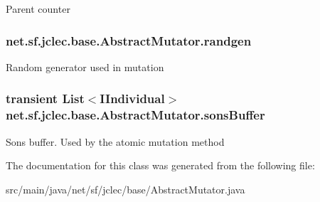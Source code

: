 Parent counter \hypertarget{classnet_1_1sf_1_1jclec_1_1base_1_1_abstract_mutator_a21907b5345c3af80722235d42aec079a}{
\subsubsection[{randgen}]{ net.\-sf.\-jclec.\-base.\-Abstract\-Mutator.\-randgen\hspace{0.3cm}{\ttfamily [protected]}}}\label{classnet_1_1sf_1_1jclec_1_1base_1_1_abstract_mutator_a21907b5345c3af80722235d42aec079a}
Random generator used in mutation \hypertarget{classnet_1_1sf_1_1jclec_1_1base_1_1_abstract_mutator_ab44190f45865606f8d385b50a7863c35}{
\subsubsection[{sons\-Buffer}]{\setlength{\rightskip}{0pt plus 5cm}transient List$<${\bf I\-Individual}$>$ net.\-sf.\-jclec.\-base.\-Abstract\-Mutator.\-sons\-Buffer\hspace{0.3cm}{\ttfamily [protected]}}}\label{classnet_1_1sf_1_1jclec_1_1base_1_1_abstract_mutator_ab44190f45865606f8d385b50a7863c35}
Sons buffer. Used by the atomic mutation method 

The documentation for this class was generated from the following file\-:\begin{DoxyCompactItemize}
\item 
src/main/java/net/sf/jclec/base/Abstract\-Mutator.\-java\end{DoxyCompactItemize}
